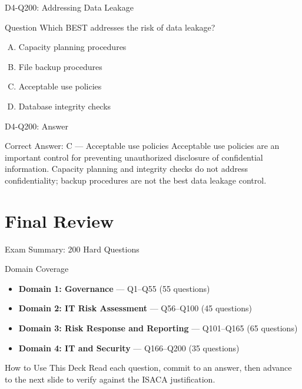 \documentclass{beamer}
\begin{document}
	\begin{frame}{D4-Q200: Addressing Data Leakage}
		\begin{block}{Question}
			Which BEST addresses the risk of data leakage?
		\end{block}
		\begin{enumerate}[(A)]
			\item Capacity planning procedures
			\item File backup procedures
			\item Acceptable use policies
			\item Database integrity checks
		\end{enumerate}
	\end{frame}
	\begin{frame}{D4-Q200: Answer}
		\begin{block}{Correct Answer: C --- Acceptable use policies}
			Acceptable use policies are an important control for preventing unauthorized disclosure of confidential information. Capacity planning and integrity checks do not address confidentiality; backup procedures are not the best data leakage control.
		\end{block}
	\end{frame}
	
	\section{Final Review}
	
	\begin{frame}{Exam Summary: 200 Hard Questions}
		\begin{block}{Domain Coverage}
			\begin{itemize}
				\item \textbf{Domain 1: Governance} --- Q1--Q55 (55 questions)
				\item \textbf{Domain 2: IT Risk Assessment} --- Q56--Q100 (45 questions)
				\item \textbf{Domain 3: Risk Response and Reporting} --- Q101--Q165 (65 questions)
				\item \textbf{Domain 4: IT and Security} --- Q166--Q200 (35 questions)
			\end{itemize}
		\end{block}
		\begin{exampleblock}{How to Use This Deck}
			Read each question, commit to an answer, then advance to the next slide to verify against the ISACA justification.
		\end{exampleblock}
	\end{frame}
	
\end{document}
